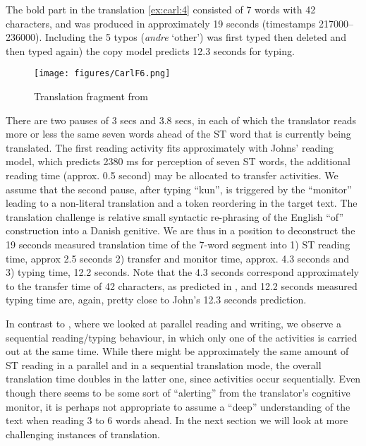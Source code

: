 \documentclass[output=paper]{LSP/langsci}
\begin{document}
The bold part in the translation \ref{ex:carl:4} consisted of 7 words with 42 characters, and was produced in approximately 19 seconds (timestamps 217000--236000). Including the 5 typos (\textit{andre} `other') was first typed then deleted and then typed again) the copy model predicts 12.3 seconds for typing. 

\begin{figure}
\texttt{[image: figures/CarlF6.png]}
\caption{Translation fragment from }
\label{fig:carl:6}
\end{figure} 

\largerpage
There are two pauses of 3 secs and 3.8 secs, in each of which the translator reads more or less the same seven words ahead of the ST word that is currently being translated. The first reading activity fits approximately with Johns' reading model, which predicts 2380 ms for perception of seven ST words, the additional reading time (approx. 0.5 second) may be allocated to transfer activities. We assume that the second pause, after typing ``kun'', is triggered by the ``monitor'' leading to a non-literal translation and a token reordering in the target text. The translation challenge is relative small syntactic re-phrasing of the English ``of'' construction into a Danish genitive. We are thus in a position to deconstruct the 19 seconds measured translation time of the 7-word segment into 1) ST reading time, approx 2.5 seconds 2) transfer and monitor time, approx. 4.3 seconds and 3) typing time, 12.2 seconds. Note that the 4.3 seconds correspond approximately to the transfer time of 42 characters, as predicted in , and 12.2 seconds measured typing time are, again, pretty close to John's 12.3 seconds prediction. 

In contrast to , where we looked at parallel reading and writing, we observe a sequential reading/typing behaviour, in which only one of the activities is carried out at the same time. While there might be approximately the same amount of ST reading in a parallel and in a sequential translation mode, the overall translation time doubles in the latter one, since activities occur sequentially. Even though there seems to be some sort of ``alerting'' from the translator's cognitive monitor, it is perhaps not appropriate to assume a ``deep'' understanding of the text when reading 3 to 6 words ahead. In the next section we will look at more challenging instances of translation.
\end{document}

